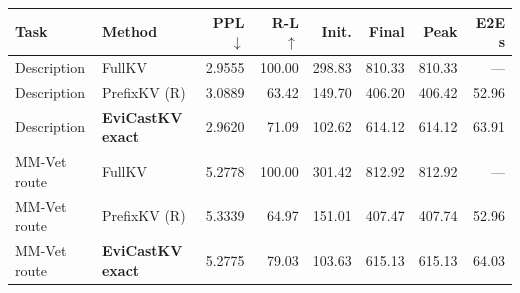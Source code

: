 \begin{tabular}{llrrrrrr}
\toprule
Task & Method & PPL $\downarrow$ & R-L $\uparrow$ & Init. & Final & Peak & E2E s\\\midrule
Description & FullKV & 2.9555 & 100.00 & 298.83 & 810.33 & 810.33 & ---\\
Description & PrefixKV (R) & 3.0889 & 63.42 & 149.70 & 406.20 & 406.42 & 52.96\\
Description & \textbf{EviCastKV exact} & 2.9620 & 71.09 & 102.62 & 614.12 & 614.12 & 63.91\\
MM-Vet route & FullKV & 5.2778 & 100.00 & 301.42 & 812.92 & 812.92 & ---\\
MM-Vet route & PrefixKV (R) & 5.3339 & 64.97 & 151.01 & 407.47 & 407.74 & 52.96\\
MM-Vet route & \textbf{EviCastKV exact} & 5.2775 & 79.03 & 103.63 & 615.13 & 615.13 & 64.03\\
\bottomrule
\end{tabular}
